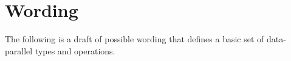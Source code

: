 \section{Wording}

The following is a draft of possible wording that defines a basic set of data-parallel types and operations.

\begin{wgText}
  
  
  
\end{wgText}
